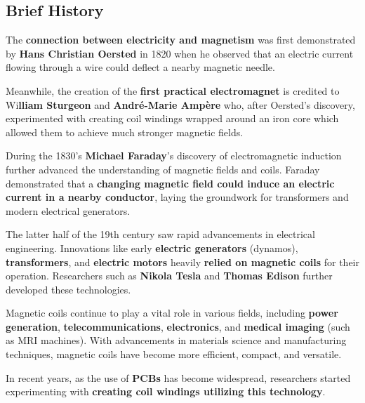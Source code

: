 \subsection{Brief History}

The \textbf{connection between electricity and magnetism} was first demonstrated by \textbf{Hans Christian Oersted} in 1820 when he observed that an electric current flowing through a wire could deflect a nearby magnetic needle.

Meanwhile, the creation of the \textbf{first practical electromagnet} is credited to Wi\textbf{lliam Sturgeon} and \textbf{André-Marie Ampère} who, after Oersted's discovery, experimented with creating coil windings wrapped around an iron core which allowed them to achieve much stronger magnetic fields.

During the 1830's \textbf{Michael Faraday}'s discovery of electromagnetic induction further advanced the understanding of magnetic fields and coils. Faraday demonstrated that a \textbf{changing magnetic field could induce an electric current in a nearby conductor}, laying the groundwork for transformers and modern electrical generators.

The latter half of the 19th century saw rapid advancements in electrical engineering. Innovations like early \textbf{electric generators} (dynamos), \textbf{transformers}, and \textbf{electric motors} heavily \textbf{relied on magnetic coils} for their operation. Researchers such as \textbf{Nikola Tesla} and \textbf{Thomas Edison} further developed these technologies.

Magnetic coils continue to play a vital role in various fields, including \textbf{power generation}, \textbf{telecommunications}, \textbf{electronics}, and \textbf{medical imaging} (such as MRI machines). With advancements in materials science and manufacturing techniques, magnetic coils have become more efficient, compact, and versatile.

In recent years, as the use of \textbf{PCBs} has become widespread, researchers started experimenting with \textbf{creating coil windings utilizing this technology}.